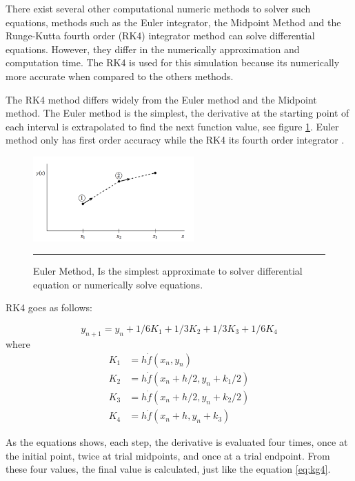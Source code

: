 There exist several other computational numeric methods to solver such equations, methods such as the Euler integrator, the Midpoint Method and the Runge-Kutta fourth order (RK4) integrator method can solve differential equations. However, they differ in the numerically approximation and computation time. The RK4 is used for this simulation because its numerically more accurate when compared to the others methods.

The RK4 method differs widely from the Euler method and the Midpoint method. The Euler method is the simplest, the derivative at the starting point of each interval is extrapolated to find the next function value, see figure \ref{fig:euler}. Euler method only has first order accuracy while the RK4 its fourth order integrator \cite{numerical}.

\begin{figure}[htbp]
	\centering
		\includegraphics[width=0.55\textwidth]{Figures/euler.png}
		\rule{35em}{0.4pt}
	\caption[Euler Method]{Euler Method, Is the simplest approximate to solver differential equation or numerically solve equations.}
	\label{fig:euler}
\end{figure}

RK4 goes as follows:

\begin{equation} \label{eq:rk4}
y_{n+1} = y_{n} + 1/6 K_{1} + 1/3 K_{2} +1/3 K_{3} + 1/6 K_{4}
\end{equation}
where
\begin{equation}
\begin{split} \label{eq:rksplit}
K_{1} &= h \dot f(x_{n}, y_{n}) \\
K_{2} &= h \dot f(x_{n} + h/2, y_{n} + k_{1}/2) \\
K_{3} &= h \dot f(x_{n} + h/2, y_{n} + k_{2}/2) \\
K_{4} &= h \dot f(x_{n} + h, y_{n} + k_{3})
\end{split}
\end{equation}

As the equations shows, each step, the derivative is evaluated four times, once at the initial point, twice at trial midpoints, and once at a trial endpoint. From these four values, the final value is calculated, just like the equation \ref{eq:kg4}.

